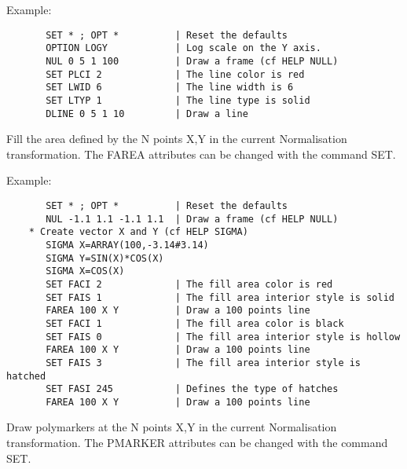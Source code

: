    \par
Example:  
\begin{verbatim}
       SET * ; OPT *          | Reset the defaults
       OPTION LOGY            | Log scale on the Y axis.
       NUL 0 5 1 100          | Draw a frame (cf HELP NULL)
       SET PLCI 2             | The line color is red
       SET LWID 6             | The line width is 6
       SET LTYP 1             | The line type is solid
       DLINE 0 5 1 10         | Draw a line
\end{verbatim}

\ENDCMD


\BEGARG
{}
\ENDARG

   \par
Fill the area defined by the N points X,Y in the current Normalisation 
   transformation.  The FAREA attributes can be changed with the command SET.  

   \par
Example:  
\begin{verbatim}
       SET * ; OPT *          | Reset the defaults
       NUL -1.1 1.1 -1.1 1.1  | Draw a frame (cf HELP NULL)
    * Create vector X and Y (cf HELP SIGMA)
       SIGMA X=ARRAY(100,-3.14#3.14)
       SIGMA Y=SIN(X)*COS(X)
       SIGMA X=COS(X)
       SET FACI 2             | The fill area color is red
       SET FAIS 1             | The fill area interior style is solid
       FAREA 100 X Y          | Draw a 100 points line
       SET FACI 1             | The fill area color is black
       SET FAIS 0             | The fill area interior style is hollow
       FAREA 100 X Y          | Draw a 100 points line
       SET FAIS 3             | The fill area interior style is hatched
       SET FASI 245           | Defines the type of hatches
       FAREA 100 X Y          | Draw a 100 points line
\end{verbatim}

\ENDCMD


\BEGARG
{}
\ENDARG

   \par
Draw polymarkers at the N points X,Y in the current Normalisation 
   transformation.  The PMARKER attributes can be changed with the command 
   SET.  

